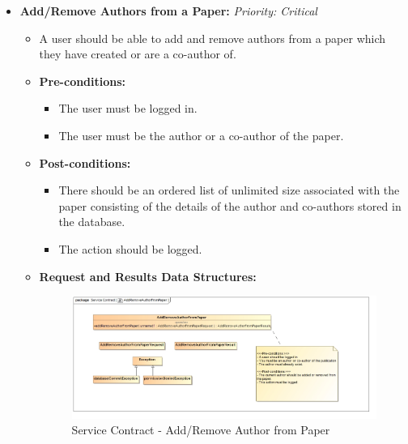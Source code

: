 \documentclass{article}
\begin{document}
\begin{itemize}
					\item \textbf{Add/Remove Authors from a Paper:} \hfill \textit{Priority: Critical}
					\begin{itemize}
						\item A user should be able to add and remove authors from a paper which they have created or are a co-author of.
						\item \textbf{Pre-conditions:}
						\begin{itemize}
							\item The user must be logged in.
							\item The user must be the author or a co-author of the paper.
						\end{itemize}
						\item \textbf{Post-conditions:}
						\begin{itemize}
							\item There should be an ordered list of unlimited size associated with the paper consisting of the details of the author and co-authors stored in the database.
							\item The action should be logged.
						\end{itemize}
						\item \textbf{Request and Results Data Structures:}
						\begin{figure}[H]
							\includegraphics[width=\linewidth]{../Diagrams/ServiceContracts/Publication subsystem/AddRemoveAuthorFromPaper.jpg}
							\caption{Service Contract - Add/Remove Author from Paper}
						\end{figure}
					\end{itemize}
					

\end{itemize}
\end{document}
